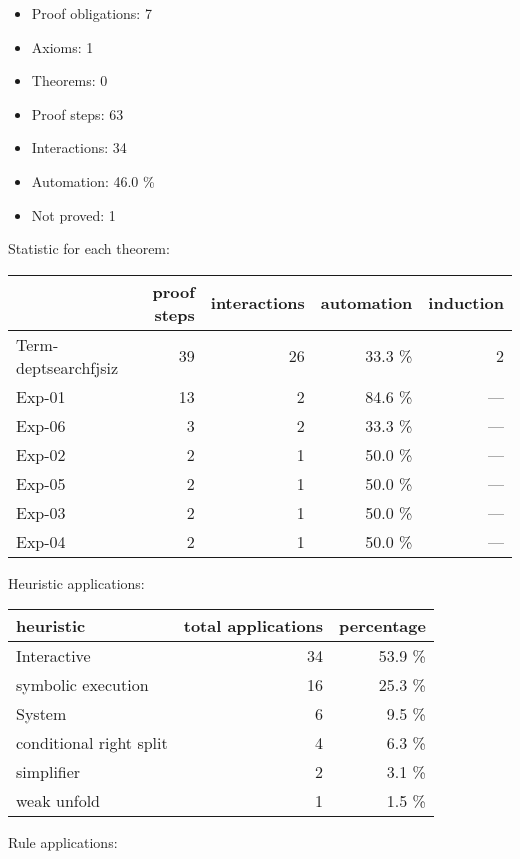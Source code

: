 \documentclass[a4paper]{article}
\begin{document}
\raggedright
              
\begin{itemize}
\item Proof obligations: 7
\item Axioms: 1
\item Theorems: 0
\item Proof steps: 63
\item Interactions: 34
\item Automation: 46.0 \%
\item Not proved: 1
\end{itemize}


Statistic for each theorem:

\begin{supertabular}{l|r|r|r|r}
	& proof steps & interactions & automation & induction\\ \hline
Term-deptsearchfjsiz & 39 & 26 & 33.3 \% & 2\\
Exp-01 & 13 & 2 & 84.6 \% & ---\\
Exp-06 & 3 & 2 & 33.3 \% & ---\\
Exp-02 & 2 & 1 & 50.0 \% & ---\\
Exp-05 & 2 & 1 & 50.0 \% & ---\\
Exp-03 & 2 & 1 & 50.0 \% & ---\\
Exp-04 & 2 & 1 & 50.0 \% & ---\\

\end{supertabular}

Heuristic applications:

\begin{supertabular}{l|r|r}
heuristic	& total applications & percentage \\ \hline
Interactive & 34 & 53.9 \% \\
symbolic execution & 16 & 25.3 \% \\
System & 6 & 9.5 \% \\
conditional right split & 4 & 6.3 \% \\
simplifier & 2 & 3.1 \% \\
weak unfold & 1 & 1.5 \% \\

\end{supertabular}

Rule applications:
\end{document}
